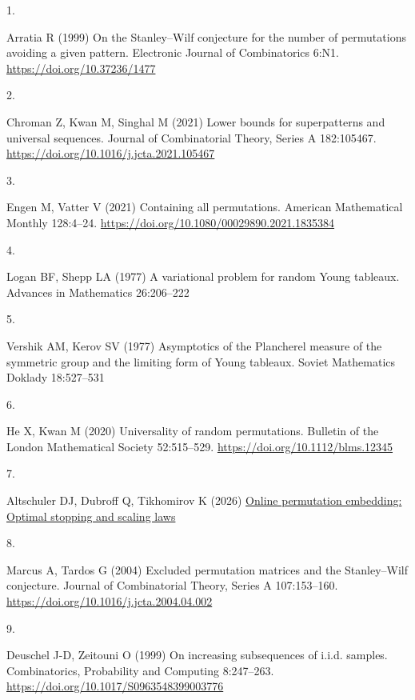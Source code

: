 \documentclass[
  11pt,
]{article}
\newlength{\cslhangindent}
\newlength{\csllabelwidth}
\newenvironment{CSLReferences}[2] %
 {\begin{list}{}{%
  \setlength{\itemindent}{0pt}
  \setlength{\leftmargin}{0pt}
  \setlength{\parsep}{0pt}
  \ifodd #1
   \setlength{\leftmargin}{\cslhangindent}
   \setlength{\itemindent}{-1\cslhangindent}
  \fi
  \setlength{\itemsep}{#2\baselineskip}}}
 {\end{list}}
\newcommand{\CSLLeftMargin}[1]{\parbox[t]{\csllabelwidth}{\strut#1\strut}}
\newcommand{\CSLRightInline}[1]{\parbox[t]{\linewidth - \csllabelwidth}{\strut#1\strut}}
\begin{document}
\protect{}\label{refs}
\begin{CSLReferences}{0}{1}
\CSLLeftMargin{1. }%
\CSLRightInline{Arratia R (1999) On the {S}tanley--{W}ilf conjecture for
the number of permutations avoiding a given pattern. Electronic Journal
of Combinatorics 6:N1. \url{https://doi.org/10.37236/1477}}

\CSLLeftMargin{2. }%
\CSLRightInline{Chroman Z, Kwan M, Singhal M (2021) Lower bounds for
superpatterns and universal sequences. Journal of Combinatorial Theory,
Series A 182:105467. \url{https://doi.org/10.1016/j.jcta.2021.105467}}

\CSLLeftMargin{3. }%
\CSLRightInline{Engen M, Vatter V (2021) Containing all permutations.
American Mathematical Monthly 128:4--24.
\url{https://doi.org/10.1080/00029890.2021.1835384}}

\CSLLeftMargin{4. }%
\CSLRightInline{Logan BF, Shepp LA (1977) A variational problem for
random {Y}oung tableaux. Advances in Mathematics 26:206--222}

\CSLLeftMargin{5. }%
\CSLRightInline{Vershik AM, Kerov SV (1977) Asymptotics of the
{P}lancherel measure of the symmetric group and the limiting form of
{Y}oung tableaux. Soviet Mathematics Doklady 18:527--531}

\CSLLeftMargin{6. }%
\CSLRightInline{He X, Kwan M (2020) Universality of random permutations.
Bulletin of the London Mathematical Society 52:515--529.
\url{https://doi.org/10.1112/blms.12345}}

\CSLLeftMargin{7. }%
\CSLRightInline{Altschuler DJ, Dubroff Q, Tikhomirov K (2026)
\href{https://arxiv.org/abs/2608.19050}{Online permutation embedding:
Optimal stopping and scaling laws}}

\CSLLeftMargin{8. }%
\CSLRightInline{Marcus A, Tardos G (2004) Excluded permutation matrices
and the {S}tanley--{W}ilf conjecture. Journal of Combinatorial Theory,
Series A 107:153--160. \url{https://doi.org/10.1016/j.jcta.2004.04.002}}

\CSLLeftMargin{9. }%
\CSLRightInline{Deuschel J-D, Zeitouni O (1999) On increasing
subsequences of i.i.d. samples. Combinatorics, Probability and Computing
8:247--263. \url{https://doi.org/10.1017/S0963548399003776}}


\end{CSLReferences}
\end{document}
